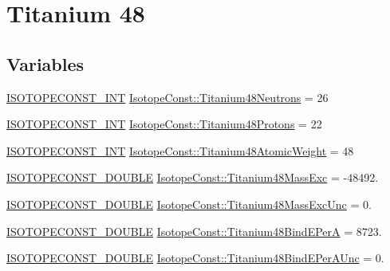 \hypertarget{group___isotope_const-_titanium-_ti48}{}\section{Titanium 48}
\label{group___isotope_const-_titanium-_ti48}
\subsection*{Variables}
\begin{DoxyCompactItemize}
\item 
\mbox{\hyperlink{group___isotope_const-_macros_ga5f18360b3e99483a35c32d789e62621c}{I\+S\+O\+T\+O\+P\+E\+C\+O\+N\+S\+T\+\_\+\+I\+NT}} \mbox{\hyperlink{group___isotope_const-_titanium-_ti48_ga5b50f5de32bbe9b5ad7145a945014bdd}{Isotope\+Const\+::\+Titanium48\+Neutrons}} = 26
\item 
\mbox{\hyperlink{group___isotope_const-_macros_ga5f18360b3e99483a35c32d789e62621c}{I\+S\+O\+T\+O\+P\+E\+C\+O\+N\+S\+T\+\_\+\+I\+NT}} \mbox{\hyperlink{group___isotope_const-_titanium-_ti48_ga4fd398ef067efed553d87a85c8ebadc6}{Isotope\+Const\+::\+Titanium48\+Protons}} = 22
\item 
\mbox{\hyperlink{group___isotope_const-_macros_ga5f18360b3e99483a35c32d789e62621c}{I\+S\+O\+T\+O\+P\+E\+C\+O\+N\+S\+T\+\_\+\+I\+NT}} \mbox{\hyperlink{group___isotope_const-_titanium-_ti48_ga8ca42f5f504be739bc4ae11f813e9a3f}{Isotope\+Const\+::\+Titanium48\+Atomic\+Weight}} = 48
\item 
\mbox{\hyperlink{group___isotope_const-_macros_ga8f45a7272ce02c0b4c65c44636ed719a}{I\+S\+O\+T\+O\+P\+E\+C\+O\+N\+S\+T\+\_\+\+D\+O\+U\+B\+LE}} \mbox{\hyperlink{group___isotope_const-_titanium-_ti48_ga4dc22e01e40025cb0d3d3782bf2d4fa2}{Isotope\+Const\+::\+Titanium48\+Mass\+Exc}} = -\/48492.
\item 
\mbox{\hyperlink{group___isotope_const-_macros_ga8f45a7272ce02c0b4c65c44636ed719a}{I\+S\+O\+T\+O\+P\+E\+C\+O\+N\+S\+T\+\_\+\+D\+O\+U\+B\+LE}} \mbox{\hyperlink{group___isotope_const-_titanium-_ti48_gacf502826ddc13143fb4c6963ab4dc530}{Isotope\+Const\+::\+Titanium48\+Mass\+Exc\+Unc}} = 0.
\item 
\mbox{\hyperlink{group___isotope_const-_macros_ga8f45a7272ce02c0b4c65c44636ed719a}{I\+S\+O\+T\+O\+P\+E\+C\+O\+N\+S\+T\+\_\+\+D\+O\+U\+B\+LE}} \mbox{\hyperlink{group___isotope_const-_titanium-_ti48_ga757c3693f2e22f35a5be20f912bc6d8d}{Isotope\+Const\+::\+Titanium48\+Bind\+E\+PerA}} = 8723.
\item 
\mbox{\hyperlink{group___isotope_const-_macros_ga8f45a7272ce02c0b4c65c44636ed719a}{I\+S\+O\+T\+O\+P\+E\+C\+O\+N\+S\+T\+\_\+\+D\+O\+U\+B\+LE}} \mbox{\hyperlink{group___isotope_const-_titanium-_ti48_ga26c0979549b77fcb4e9170855da27204}{Isotope\+Const\+::\+Titanium48\+Bind\+E\+Per\+A\+Unc}} = 0.

\end{DoxyCompactItemize}
